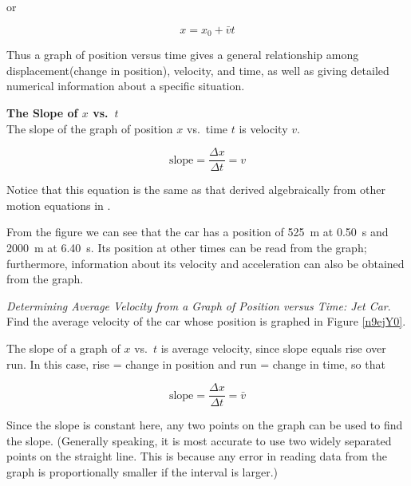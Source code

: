 \documentclass[main-ap-physics.tex]{subfiles}
\begin{document}
or

\begin{equation}
    x = x_0 + \bar{v} t
\end{equation}

Thus a graph of position versus time gives a general relationship among displacement(change in position), velocity, and time, as well as giving detailed numerical information about a specific situation.

\vspace{1em}

\begin{mdframed}[backgroundcolor=black!10]
\textbf{The Slope of $x$ vs.~$t$}\\
The slope of the graph of position $x$ vs.~time $t$ is velocity $v$.

\begin{equation}
    \text{slope} = \frac{\Delta x}{\Delta t} = v
\end{equation}

Notice that this equation is the same as that derived algebraically from other motion equations in . 
\end{mdframed}

From the figure we can see that the car has a position of \SI{525}{m} at \SI{0.50}{s} and \SI{2000}{m} at \SI{6.40}{s}. Its position at other times can be read from the graph; furthermore, information about its velocity and acceleration can also be obtained from the graph.

\begin{example}
    \textit{Determining Average Velocity from a Graph of Position versus Time: Jet Car}. Find the average velocity of the car whose position is graphed in Figure \ref{n9ejY0}.
\end{example}

\Solution The slope of a graph of $x$ vs.~$t$ is average velocity, since slope equals rise over run. In this case, rise = change in position and run = change in time, so that

\begin{equation*}
    \text{slope} = \frac{\Delta x}{\Delta t} = \bar{v}
\end{equation*}

Since the slope is constant here, any two points on the graph can be used to find the slope. (Generally speaking, it is most accurate to use two widely separated points on the straight line. This is because any error in reading data from the graph is proportionally smaller if the interval is larger.)
\end{document}
